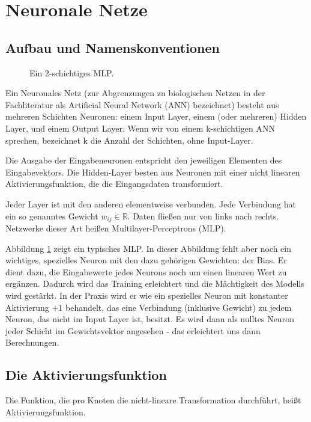 \section{Neuronale Netze} %

\subsection{Aufbau und Namenskonventionen}
\begin{figure}[ht!]
  \centering
    
  \caption{Ein 2-schichtiges MLP.}
  \label{fig:MLP}
\end{figure}


Ein Neuronales Netz (zur Abgrenzungen zu biologischen Netzen in der Fachliteratur als Artificial Neural Network (ANN) bezeichnet) besteht aus mehreren Schichten Neuronen: einem Input Layer, einem (oder mehreren) Hidden Layer, und einem Output Layer. 
Wenn wir von einem k-schichtigen ANN sprechen, bezeichnet k die Anzahl der Schichten, ohne Input-Layer.

Die Ausgabe der Eingabeneuronen entspricht den jeweiligen Elementen des Eingabevektors.
Die Hidden-Layer besten aus Neuronen mit einer nicht linearen Aktivierungsfunktion, die die Eingangsdaten transformiert.

Jeder Layer ist mit den anderen elementweise verbunden. Jede Verbindung hat ein so genanntes Gewicht $w_{ij} \in \mathbb{R}$. Daten fließen nur von links nach rechts. Netzwerke dieser Art heißen Multilayer-Perceptrons (MLP). 

Abbildung \ref{fig:MLP} zeigt ein typisches MLP. In dieser Abbildung fehlt aber noch ein wichtiges, spezielles Neuron mit den dazu gehörigen Gewichten: der Bias. Er dient dazu, die Eingabewerte jedes Neurons noch um einen linearen Wert zu ergänzen. Dadurch wird das Training erleichtert und die Mächtigkeit des Modells wird gestärkt. In der Praxis wird er wie ein spezielles Neuron mit konstanter Aktivierung $+1$ behandelt, das eine Verbindung (inklusive Gewicht) zu jedem Neuron, das nicht im Input Layer ist, besitzt. Es wird dann als nulltes Neuron jeder Schicht im Gewichtsvektor angesehen - das erleichtert uns dann Berechnungen.
 

\subsection{Die Aktivierungsfunktion}

Die Funktion, die pro Knoten die nicht-lineare Transformation durchführt, heißt Aktivierungsfunktion. 

